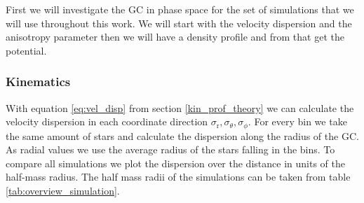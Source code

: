 First we will investigate the \ac{GC} in phase space for the set of simulations that we will use throughout this work. We will start with the velocity dispersion and the anisotropy parameter then we will have a density profile and from that get the potential. 

\subsubsection{Kinematics}
With equation \eqref{eq:vel_disp} from section \ref{kin_prof_theory} we can calculate the velocity dispersion in each coordinate direction \(\sigma_\mathrm{r},\sigma_\theta,\sigma_\phi\). For every bin we take the same amount of stars and calculate the dispersion along the radius of the \ac{GC}. As radial values we use the average radius of the stars falling in the bins. To compare all simulations we plot the dispersion over the distance in units of the half-mass radius. The half mass radii of the simulations can be taken from table \ref{tab:overview_simulation}. 
